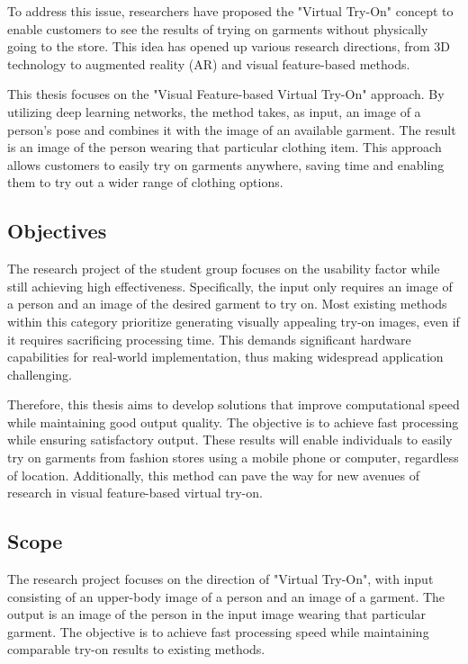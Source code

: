 \documentclass{article}[14pt]
\begin{document}
To address this issue, researchers have proposed the "Virtual Try-On" concept to enable customers to see the results of trying on garments without physically going to the store. This idea has opened up various research directions, from 3D technology to augmented reality (AR) and visual feature-based methods.

This thesis focuses on the "Visual Feature-based Virtual Try-On" approach. By utilizing deep learning networks, the method takes, as input, an image of a person's pose and combines it with the image of an available garment. The result is an image of the person wearing that particular clothing item. This approach allows customers to easily try on garments anywhere, saving time and enabling them to try out a wider range of clothing options.

\subsection{Objectives}
The research project of the student group focuses on the usability factor while still achieving high effectiveness. Specifically, the input only requires an image of a person and an image of the desired garment to try on. Most existing methods within this category prioritize generating visually appealing try-on images, even if it requires sacrificing processing time. This demands significant hardware capabilities for real-world implementation, thus making widespread application challenging.

Therefore, this thesis aims to develop solutions that improve computational speed while maintaining good output quality. The objective is to achieve fast processing while ensuring satisfactory output. These results will enable individuals to easily try on garments from fashion stores using a mobile phone or computer, regardless of location. Additionally, this method can pave the way for new avenues of research in visual feature-based virtual try-on.

\subsection{Scope}

The research project focuses on the direction of "Virtual Try-On", with input consisting of an upper-body image of a person and an image of a garment. The output is an image of the person in the input image wearing that particular garment. The objective is to achieve fast processing speed while maintaining comparable try-on results to existing methods.
\end{document}

